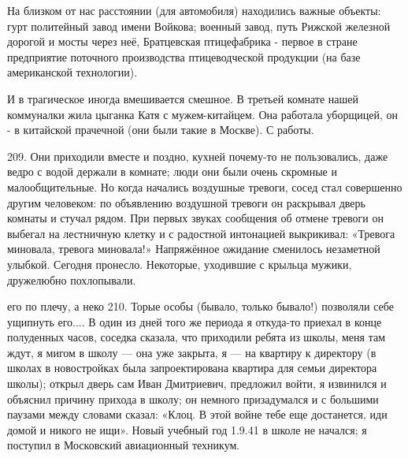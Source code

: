 На близком от нас расстоянии (для автомобиля) находились важные объекты: гурт политейный завод имени Войкова; военный завод, путь Рижской железной дорогой и мосты через неё, Братцевская птицефабрика - первое в стране предприятие поточного производства птицеводческой продукции (на базе американской технологии).

И в трагическое иногда вмешивается смешное. В третьей комнате нашей коммуналки жила цыганка Катя с мужем-китайцем. Она работала уборщицей, он - в китайской прачечной (они были такие в Москве). С работы.

209.
Они приходили вместе и поздно, кухней почему-то не пользовались, даже ведро с водой держали в комнате; люди они были очень скромные и малообщительные. Но когда начались воздушные тревоги, сосед стал совершенно другим человеком: по объявлению воздушной тревоги он раскрывал дверь комнаты и стучал рядом. При первых звуках сообщения об отмене тревоги он выбегал на лестничную клетку и с радостной интонацией выкрикивал: «Тревога миновала, тревога миновала!» Напряжённое ожидание сменилось незаметной улыбкой. Сегодня пронесло. Некоторые, уходившие с крыльца мужики, дружелюбно похлопывали.

его по плечу, а неко 210. Торые особы (бывало, только бывало!) позволяли себе ущипнуть его.... В один из дней того же периода я откуда-то приехал в конце полуденных часов, соседка сказала, что приходили ребята из школы, меня там ждут, я мигом в школу — она уже закрыта, я — на квартиру к директору (в школах в новостройках была запроектирована квартира для семьи директора школы); открыл дверь сам Иван Дмитриевич, предложил войти, я извинился и объяснил причину прихода в школу; он немного призадумался и с большими паузами между словами сказал: «Клоц. В этой войне тебе еще достанется, иди домой и никого не ищи». Новый учебный год 1.9.41 в школе не начался; я поступил в Московский авиационный техникум.
